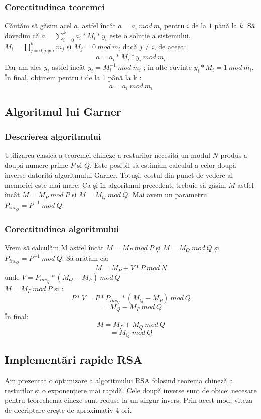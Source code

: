 \documentclass[12]{report}
\begin{document}
	 \subsubsection{Corectitudinea teoremei}
	 Căutăm să găsim acel $a$, astfel încât $ a = a_i \ mod \ m_i $ pentru $i$ de la $1$ până la $k$. Să dovedim că $ a = \sum_{i=0}^{k} a_i * M_i * y_i $ este o soluție a sistemului. \\
	 $M_i= \prod_{j=0,j \neq i}^{k} m_j $ și $M_j=0 \ mod \ m_i $ dacă $j \neq i$, de aceea: 
	 $$ a = a_i * M_i * y_i \ mod \ m_i $$
	 Dar am ales $y_i$ astfel încât $y_i = M_{i}^{-1} \ mod \ m_i$ ; în alte cuvinte $y_i * M_i = 1 \ mod \ m_i$. În final, obținem pentru i de la 1 până la k :
	 $$ a = a_i \  mod \ m_i$$
	 
	 \subsection{Algoritmul lui Garner}
	  \subsubsection{Descrierea algoritmului}
	  Utilizarea clasică a teoremei chineze a resturilor necesită un modul $N$ produs a doupă numere prime $P$ și $Q$. Este posibil să estimăm calculul a celor doupă inverse datorită algoritmului Garner. Totuși, costul din punct de vedere al memoriei este mai mare. Ca și în algoritmul precedent, trebuie să găsim $M$ astfel încât $ M = M_P \ mod \ P$ și $M = M_Q \ mod \ Q$. Mai avem un parametru $ P_{inv_Q} = P^{-1} \ mod \ Q$.
	  \subsubsection{Corectitudinea algoritmului}
	  Vrem să calculăm M astfel încât $M =M_P \ mod \ P$ și $M=M_Q \ mod \ Q$ și $P_{inv_Q}=P^{-1} \ mod \ Q$. Să arătăm că: \\
	  $$ M=M_P + V*P \ mod \ N$$
	  unde $ V=P_{inv_Q} * (M_Q-M_P) \ mod \ Q$ \\
	  $M = M_P \ mod \ P$ și : \\
	  $$P*V= P* P_{inv_Q} * (M_Q - M_P) \ mod \ Q$$
	  $$ = M_Q - M_P \ mod \ Q$$
	  În final: \\
	  $$ M= M_P + M_Q \ mod \ Q$$
	  $$ = M_Q \ mod \ Q $$
	  
	  \subsection{Implementări rapide RSA}
	  Am prezentat o optimizare a algoritmului RSA folosind teorema chineză a resturilor și o exponențiere mai rapidă. Cele doupă inverse sunt de obicei necesare pentru teorechema cineze sunt reduse la un singur invers. Prin acest mod, viteza de decriptare crește de aproximativ $4$ ori.
\end{document}
